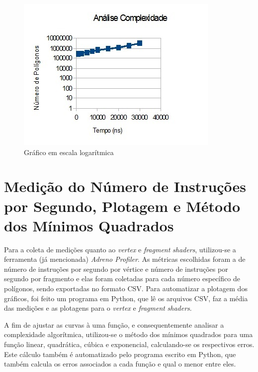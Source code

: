 	\begin{figure}[h]
	\centering
		\includegraphics[keepaspectratio=true,scale=1.0]{figuras/ndk_reta.jpg}
	\caption{Gráfico em escala logarítmica}
	\label{ndk_reta}
	\end{figure}

\section{Medição do Número de Instruções por Segundo, Plotagem e Método dos Mínimos Quadrados}

	Para a coleta de medições quanto ao \textit{vertex} e \textit{fragment} \textit{shaders}, utilizou-se a ferramenta (já mencionada) \textit{Adreno Profiler}. As métricas escolhidas foram a de número de instruções por segundo por vértice e número de instruções por segundo por fragmento e elas foram coletadas para cada número específico de polígonos, sendo exportadas no formato CSV. Para automatizar a plotagem dos gráficos, foi feito um programa em Python, que lê os arquivos CSV, faz a média das medições e as plotagens para o \textit{vertex} e \textit{fragment} \textit{shaders}. 

	A fim de ajustar as curvas à uma função, e consequentemente analisar a complexidade algorítmica, utilizou-se o método dos mínimos quadrados para uma função linear, quadrática, cúbica e exponencial, calculando-se os respectivos erros. Este cálculo também é automatizado pelo programa escrito em Python, que também calcula os erros associados a cada função e qual o menor entre eles. 
 
